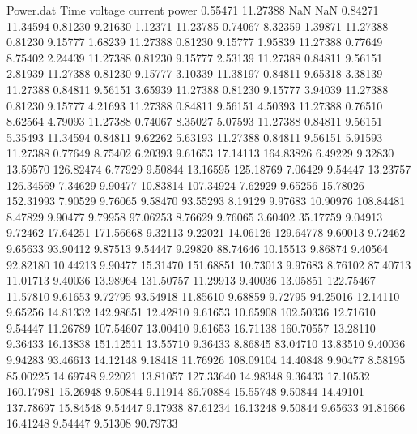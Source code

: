 \begin{filecontents}{Power.dat}
Time voltage current power
   0.55471   11.27388        NaN        NaN
   0.84271   11.34594    0.81230    9.21630
   1.12371   11.23785    0.74067    8.32359
   1.39871   11.27388    0.81230    9.15777
   1.68239   11.27388    0.81230    9.15777
   1.95839   11.27388    0.77649    8.75402
   2.24439   11.27388    0.81230    9.15777
   2.53139   11.27388    0.84811    9.56151
   2.81939   11.27388    0.81230    9.15777
   3.10339   11.38197    0.84811    9.65318
   3.38139   11.27388    0.84811    9.56151
   3.65939   11.27388    0.81230    9.15777
   3.94039   11.27388    0.81230    9.15777
   4.21693   11.27388    0.84811    9.56151
   4.50393   11.27388    0.76510    8.62564
   4.79093   11.27388    0.74067    8.35027
   5.07593   11.27388    0.84811    9.56151
   5.35493   11.34594    0.84811    9.62262
   5.63193   11.27388    0.84811    9.56151
   5.91593   11.27388    0.77649    8.75402
   6.20393    9.61653   17.14113  164.83826
   6.49229    9.32830   13.59570  126.82474
   6.77929    9.50844   13.16595  125.18769
   7.06429    9.54447   13.23757  126.34569
   7.34629    9.90477   10.83814  107.34924
   7.62929    9.65256   15.78026  152.31993
   7.90529    9.76065    9.58470   93.55293
   8.19129    9.97683   10.90976  108.84481
   8.47829    9.90477    9.79958   97.06253
   8.76629    9.76065    3.60402   35.17759
   9.04913    9.72462   17.64251  171.56668
   9.32113    9.22021   14.06126  129.64778
   9.60013    9.72462    9.65633   93.90412
   9.87513    9.54447    9.29820   88.74646
  10.15513    9.86874    9.40564   92.82180
  10.44213    9.90477   15.31470  151.68851
  10.73013    9.97683    8.76102   87.40713
  11.01713    9.40036   13.98964  131.50757
  11.29913    9.40036   13.05851  122.75467
  11.57810    9.61653    9.72795   93.54918
  11.85610    9.68859    9.72795   94.25016
  12.14110    9.65256   14.81332  142.98651
  12.42810    9.61653   10.65908  102.50336
  12.71610    9.54447   11.26789  107.54607
  13.00410    9.61653   16.71138  160.70557
  13.28110    9.36433   16.13838  151.12511
  13.55710    9.36433    8.86845   83.04710
  13.83510    9.40036    9.94283   93.46613
  14.12148    9.18418   11.76926  108.09104
  14.40848    9.90477    8.58195   85.00225
  14.69748    9.22021   13.81057  127.33640
  14.98348    9.36433   17.10532  160.17981
  15.26948    9.50844    9.11914   86.70884
  15.55748    9.50844   14.49101  137.78697
  15.84548    9.54447    9.17938   87.61234
  16.13248    9.50844    9.65633   91.81666
  16.41248    9.54447    9.51308   90.79733

\end{filecontents}
